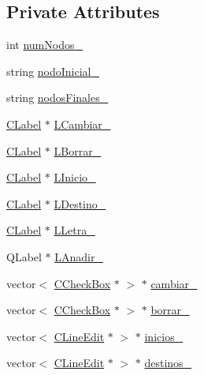\subsection*{Private Attributes}
\begin{DoxyCompactItemize}
\item 
int \hyperlink{classCAsistenteCodificacion_a3c77dcdb74837345c1da4a6a7051ee4e}{num\+Nodos\+\_\+}
\item 
string \hyperlink{classCAsistenteCodificacion_ad0d97f8664aa927a414b7fe17b6106d4}{nodo\+Inicial\+\_\+}
\item 
string \hyperlink{classCAsistenteCodificacion_afa94c6d482da4f5eb193ddd7211db25f}{nodos\+Finales\+\_\+}
\item 
\hyperlink{classCLabel}{C\+Label} $\ast$ \hyperlink{classCAsistenteCodificacion_af6fcb3e27669afa7b4cc3a3916e90ea3}{L\+Cambiar\+\_\+}
\item 
\hyperlink{classCLabel}{C\+Label} $\ast$ \hyperlink{classCAsistenteCodificacion_a2820e2c5c034ae5641b3c0a927921be9}{L\+Borrar\+\_\+}
\item 
\hyperlink{classCLabel}{C\+Label} $\ast$ \hyperlink{classCAsistenteCodificacion_a552db8480f43d39488afc2a3485fb8bd}{L\+Inicio\+\_\+}
\item 
\hyperlink{classCLabel}{C\+Label} $\ast$ \hyperlink{classCAsistenteCodificacion_a666efef7460347c564d7a73322ed435c}{L\+Destino\+\_\+}
\item 
\hyperlink{classCLabel}{C\+Label} $\ast$ \hyperlink{classCAsistenteCodificacion_a1da0f6a2c6447b3f0f7e7e9267ef278c}{L\+Letra\+\_\+}
\item 
Q\+Label $\ast$ \hyperlink{classCAsistenteCodificacion_acd2847b7726990965a4e5aa5d5278805}{L\+Anadir\+\_\+}
\item 
vector$<$ \hyperlink{classCCheckBox}{C\+Check\+Box} $\ast$ $>$ $\ast$ \hyperlink{classCAsistenteCodificacion_a7c50f4349d8de445b66d49a1a34df74a}{cambiar\+\_\+}
\item 
vector$<$ \hyperlink{classCCheckBox}{C\+Check\+Box} $\ast$ $>$ $\ast$ \hyperlink{classCAsistenteCodificacion_a6cc0224f0b309b0b997b0178ab7e69e6}{borrar\+\_\+}
\item 
vector$<$ \hyperlink{classCLineEdit}{C\+Line\+Edit} $\ast$ $>$ $\ast$ \hyperlink{classCAsistenteCodificacion_ac0ac600fe894126b5273249b1748a267}{inicios\+\_\+}
\item 
vector$<$ \hyperlink{classCLineEdit}{C\+Line\+Edit} $\ast$ $>$ $\ast$ \hyperlink{classCAsistenteCodificacion_a421a87b8ddfa213452349bcf55b22d27}{destinos\+\_\+}
\item 

\end{DoxyCompactItemize}
